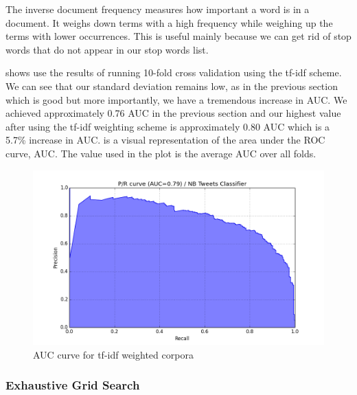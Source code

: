 The inverse document frequency measures how important a word is in a document. It weighs down terms
with a high frequency while weighing up the terms with lower occurrences. This is useful mainly
because we can get rid of stop words that do not appear in our stop words list.

 shows use the results of running 10-fold cross validation using the
tf-idf scheme. We can see that our standard deviation remains low, as in the previous section which
is good but more importantly, we have a tremendous increase in AUC\@. We achieved approximately
0.76 AUC in the previous section and our highest value after using the tf-idf weighting scheme is
approximately 0.80 AUC which is a 5.7\% increase in AUC\@.  is a visual
representation of the area under the ROC curve, AUC\@. The value used in the plot is the average AUC
over all folds.

\begin{figure}
  \includegraphics[width=\linewidth]{Figures/pr_NB_Tweets_Classifier_03}
\caption{AUC curve for tf-idf weighted corpora}
\label{fig:auc-tfidf}
\end{figure}



\subsubsection{Exhaustive Grid Search}
\label{sec:exhaustive-grid-search}

